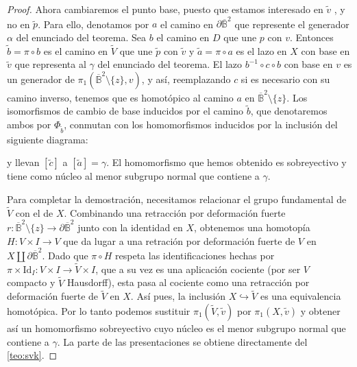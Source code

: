 \documentclass[10pt]{report}
\newcommand{\Disco}{\overline{\mathbb{B}}^2}
\theoremstyle{definition}
\begin{document}
\begin{proof}
Ahora cambiaremos el punto base, puesto que estamos interesado en $\tilde{v}$ , y no en $\tilde{p}$. Para ello, denotamos por $a$ el camino en $\partial \Disco $ que represente el generador $\alpha$ del enunciado del teorema. Sea $b$ el camino en $D$ que une $p$ con $v$. Entonces $\tilde{b} =\pi \circ b$ es el camino en $\tilde{V}$ que une $\tilde{p}$ con $\tilde{v}$ y $\tilde{a} = \pi \circ a$ es el lazo en $X$ con base en $\tilde{v}$ que representa al $\gamma$ del enunciado del teorema. El lazo $b^{-1} \circ c \circ b$ con base en $v$ es un generador de $\pi_1 (\Disco \setminus \{ z \} , v)$, y así, reemplazando $c$ si es necesario con su camino inverso, tenemos que es homotópico al camino $a$ en $\Disco \setminus \{ z \}$. Los isomorfismos de cambio de base inducidos por el camino $\tilde{b}$, que denotaremos ambos por $\Phi_{\tilde{b}}$, conmutan con los homomorfismos inducidos por la inclusión del siguiente diagrama:
\begin{center}
\end{center}
y llevan $\left[ \tilde{c} \right]$ a $\left[ \tilde{a} \right] =\gamma$. El homomorfismo que hemos obtenido es sobreyectivo y tiene como núcleo al menor subgrupo normal que contiene a $\gamma$.

Para completar la demostración, necesitamos relacionar el grupo fundamental de $\tilde{V}$ con el de $X$. Combinando una retracción por deformación fuerte $r:\Disco \setminus \{ z \} \to \partial \Disco$ junto con la identidad en $X$, obtenemos una homotopía $H: V\times I \to V$ que da lugar a una retración por deformación fuerte de $V$ en $X \amalg \partial \Disco$. Dado que $\pi \circ H$ respeta las identificaciones hechas por $\pi \times \text{Id}_I : V \times I \to \tilde{V} \times I$, que a su vez es una aplicación cociente (por ser $V $ compacto y $\tilde{V}$ Hausdorff), esta pasa al cociente como una retracción por deformación fuerte de $\tilde{V}$ en $X$. Así pues, la inclusión $X \hookrightarrow \tilde{V}$ es una equivalencia homotópica. Por lo tanto podemos sustituir $\pi_1 (\tilde{V} , \tilde{v} )$ por $\pi_1 (X, \tilde{v} )$ y obtener así un homomorfismo sobreyectivo cuyo núcleo es el menor subgrupo normal que contiene a $\gamma$. La parte de las presentaciones se obtiene directamente del \autoref{teo:svk}. 



\end{proof}
\end{document}
